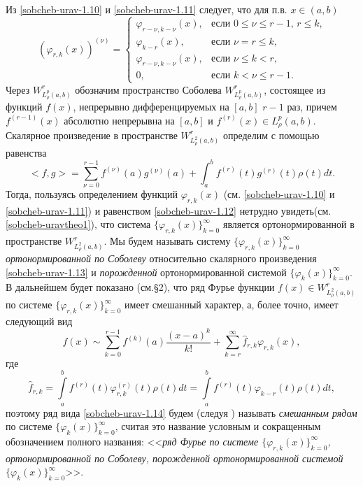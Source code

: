  Из \eqref{sobcheb-urav-1.10} и \eqref{sobcheb-urav-1.11} следует, что для п.в. $x\in (a,b)$
 \begin{equation}\label{sobcheb-urav-1.12}
(\varphi_{r,k}(x))^{(\nu)} =\begin{cases}\varphi_{r-\nu,k-\nu}(x),&\text{если $0\le\nu\le r-1$, $r\le k$,}\\
\varphi_{k-r}(x),&\text{если  $\nu=r\le k$,}\\
\varphi_{r-\nu,k-\nu}(x),&\text{если $\nu\le k< r$,}\\
0,&\text{если $k< \nu\le r-1$}.
  \end{cases}
\end{equation}
Через $W^r_{L^p_\rho(a,b)}$ обозначим пространство Соболева $W^r_{L^p_\rho(a,b)}$, состоящее из функций $f(x)$, непрерывно дифференцируемых на $[a,b]$ $r-1$ раз, причем $f^{(r-1)}(x)$ абсолютно непрерывна на $[a,b]$  и $f^{(r)}(x)\in L^p_\rho(a,b)$.
Скалярное произведение в пространстве $W^r_{L^2_\rho(a,b)}$ определим с помощью равенства
\begin{equation}\label{sobcheb-urav-1.13}
<f,g>=\sum_{\nu=0}^{r-1}f^{(\nu)}(a)g^{(\nu)}(a)+\int_{a}^{b} f^{(r)}(t)g^{(r)}(t)\rho(t) dt.
\end{equation}
Тогда, пользуясь определением функций  $\varphi_{r,k}(x)$ (см. \eqref{sobcheb-urav-1.10} и \eqref{sobcheb-urav-1.11}) и равенством  \eqref{sobcheb-urav-1.12} нетрудно увидеть(см. \ref{sobcheb-uravtheo1}),  что система $\{\varphi_{r,k}(x)\}_{k=0}^\infty$ является ортонормированной в пространстве $W^r_{L^2_\rho(a,b)}$.  Мы будем называть систему $\{\varphi_{r,k}(x)\}_{k=0}^\infty$ \textit{ортонормированной по Соболеву } относительно скалярного произведения \eqref{sobcheb-urav-1.13} и  \textit{порожденной} ортонормированной системой $\{\varphi_{k}(x)\}_{k=0}^\infty$.
В дальнейшем будет показано (см.\S2),  что ряд Фурье функции $f(x)\in W^r_{L^2_\rho(a,b)}$ по системе  $\{\varphi_{r,k}(x)\}_{k=0}^\infty$ имеет смешанный характер, а, более точно, имеет следующий вид
  \begin{equation}\label{sobcheb-urav-1.14}
f(x)\sim \sum_{k=0}^{r-1} f^{(k)}(a)\frac{(x-a)^k}{k!}+ \sum_{k=r}^\infty \hat f_{r,k}\varphi_{r,k}(x),
\end{equation}
где
  \begin{equation}\label{sobcheb-urav-1.15}
 \hat f_{r,k}=\int\limits_a^b f^{(r)}(t) \varphi^{(r)}_{r,k}(t)\rho(t)dt=\int\limits_a^b f^{(r)}(t) \varphi_{k-r}(t)\rho(t)dt,
\end{equation}
поэтому ряд  вида \eqref{sobcheb-urav-1.14} будем (следуя
\cite{sobcheb_urav-Shar11,sobcheb_urav-Shar12,sobcheb_urav-Shar13,sobcheb_urav-Shar14,sobcheb_urav-Shar15,
sobcheb_urav-Shar16})  называть \textit{смешанным рядом} по  системе $\{\varphi_{k}(x)\}_{k=0}^\infty$, считая это название условным и сокращенным обозначением полного названия: <<\textit{ряд Фурье по системе  $\{\varphi_{r,k}(x)\}_{k=0}^\infty$, ортонормированной по Соболеву, порожденной ортонормированной системой $\{\varphi_{k}(x)\}_{k=0}^\infty$}>>.



